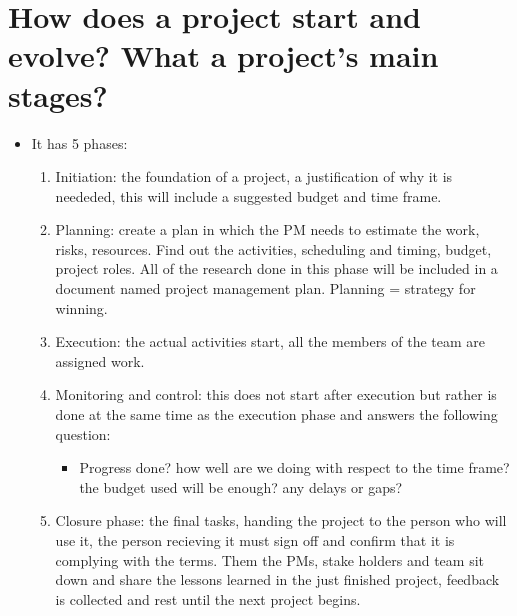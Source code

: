 \section{How does a project start and evolve? What a project's main stages?}
\begin{itemize}
    \item It has 5 phases:
        \begin{enumerate}
            \item Initiation: the foundation of a project, a justification of why it is neededed, this will include a suggested budget and time frame.
            \item Planning: create a plan in which the PM needs to estimate the work, risks, resources. Find out the activities, scheduling and timing, budget, project roles. All of the research done in this phase will be included in a document named project management plan. Planning = strategy for winning.
            \item Execution: the actual activities start, all the members of the team are assigned work.
            \item Monitoring and control: this does not start after execution but rather is done at the same time as the execution phase and answers the following question:
                \begin{itemize}
                    \item Progress done? how well are we doing with respect to the time frame? the budget used will be enough? any delays or gaps?
                \end{itemize}
            
            \item Closure phase: the final tasks, handing the project to the person who will use it, the person recieving it must sign off and confirm that it is complying with the terms. Them the PMs, stake holders and team sit down and share the lessons learned in the just finished project, feedback is collected and rest until the next project begins.
        \end{enumerate}
\end{itemize}